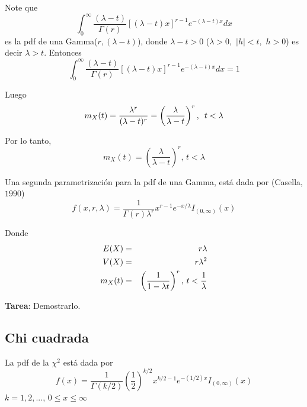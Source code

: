 \begin{i}
Note que 
\begin{equation*}
\int_{0}^{\infty }\frac{(\lambda -t)}{\Gamma (r)}\left[ (\lambda -t)x\right]
^{r-1}e^{-(\lambda -t)x}dx
\end{equation*}%
es la pdf de una Gamma($r,(\lambda -t)$), donde $\lambda -t>0$ ($\lambda >0,$
$\left\vert h\right\vert <t,$ $h>0$) es decir $\lambda >t.$ Entonces 
\begin{equation*}
\int_{0}^{\infty }\frac{(\lambda -t)}{\Gamma (r)}\left[ (\lambda -t)x\right]
^{r-1}e^{-(\lambda -t)x}dx=1
\end{equation*}

Luego
\begin{equation*}
m_{X}(t)=\frac{\lambda ^{r}}{(\lambda -t)^{r}}=\left( \frac{\lambda }{%
\lambda -t}\right) ^{r}\text{, \ }t<\lambda
\end{equation*}

Por lo tanto, 
\begin{equation*}
m_{X}(t)=\left( \frac{\lambda }{\lambda -t}\right) ^{r}\text{, \ }t<\lambda
\end{equation*}

Una segunda parametrización para la pdf de una Gamma, está dada por (Casella, $1990$) 
\begin{equation*}
f(x,r,\lambda )=\frac{1}{\Gamma (r)\lambda ^{r}}x^{r-1}e^{-x/\lambda
}I_{(0,\infty )}(x)
\end{equation*}

Donde
\begin{eqnarray*}
E(X) &=&r\lambda \\
V(X) &=&r\lambda ^{2} \\
m_{X}(t) &=&\left( \frac{1}{1-\lambda t}\right) ^{r}\text{, }t<\frac{1}{%
\lambda }
\end{eqnarray*}


\textbf{Tarea}: Demostrarlo.

\subsection{Chi cuadrada}

\begin{definition}
La  pdf de la $\chi^2$ está dada por
$$
f(x)=\frac{1}{\Gamma(k/2)}\left(\frac{1}{2}\right)^{k/2}x^{k/2-1}e^{-(1/2)x}I_{(0,\infty)}(x)
$$    
$k=1,2,...$, $0\leq x\leq \infty $
\end{definition}


\end{i}
